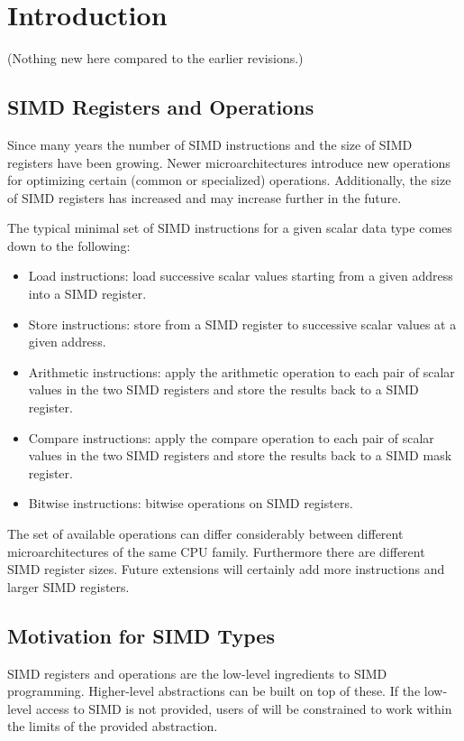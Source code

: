 \section{Introduction}
(Nothing new here compared to the earlier revisions.)

\subsection{SIMD Registers and Operations}
Since many years the number of SIMD instructions and the size of SIMD registers have been growing.
Newer microarchitectures introduce new operations for optimizing certain (common or specialized) operations.
Additionally, the size of SIMD registers has increased and may increase further in the future.

The typical minimal set of SIMD instructions for a given scalar data type comes down to the following:
\begin{itemize}
  \item Load instructions: load  successive scalar values starting from a given address into a SIMD register.
  \item Store instructions: store from a SIMD register to  successive scalar values at a given address.
  \item Arithmetic instructions: apply the arithmetic operation to each pair of scalar values in the two SIMD registers and store the results back to a SIMD register.
  \item Compare instructions: apply the compare operation to each pair of scalar values in the two SIMD registers and store the results back to a SIMD mask register.
  \item Bitwise instructions: bitwise operations on SIMD registers.
\end{itemize}

The set of available operations can differ considerably between different microarchitectures of the same CPU family.
Furthermore there are different SIMD register sizes.
Future extensions will certainly add more instructions and larger SIMD registers.

\subsection{Motivation for SIMD Types}
SIMD registers and operations are the low-level ingredients to SIMD programming.
Higher-level abstractions can be built on top of these.
If the low-level access to SIMD is not provided, users of \CC{} will be constrained to work within the limits of the provided abstraction.

